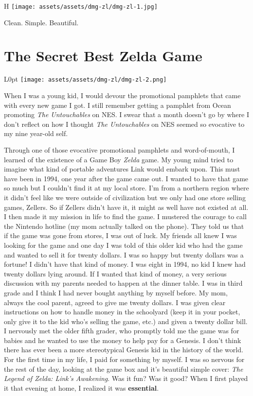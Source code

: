 \documentclass{book}
\begin{document}
\begin{wrapfigure}{H}{\linewidth}
\vskip 4pt
\centering \texttt{[image: assets/assets/dmg-zl/dmg-zl-1.jpg]}\par\pagetwodescription Clean. Simple. Beautiful.\end{wrapfigure}
\clearpage

\FloatBarrier\needspace{5pt}\section*{The Secret Best Zelda Game}\nopagebreak[4]

\begin{wrapfigure}{L}{0pt} \texttt{[image: assets/assets/dmg-zl/dmg-zl-2.png]}\end{wrapfigure}
When I was a young kid, I would devour the promotional pamphlets that came with every new game I got. I still remember getting a pamphlet from Ocean promoting \emph{The Untouchables} on NES. I swear that a month doesn’t go by where I don’t reflect on how I thought \emph{The Untouchables} on NES seemed so evocative to my nine year-old self.

Through one of those evocative promotional pamphlets and word-of-mouth, I learned of the existence of a Game Boy \emph{Zelda} game. My young mind tried to imagine what kind of portable adventures Link would embark upon. This must have been in 1994, one year after the game came out. I wanted to have that game so much but I couldn’t find it at my local store. I’m from a northern region where it didn’t feel like we were outside of civilization but we only had one store selling games, Zellers. So if Zellers didn’t have it, it might as well have not existed at all. I then made it my mission in life to find the game. I mustered the courage to call the Nintendo hotline (my mom actually talked on the phone). They told us that if the game was gone from stores, I was out of luck. My friends all knew I was looking for the game and one day I was told of this older kid who had the game and wanted to sell it for twenty dollars. I was so happy but twenty dollars was a fortune! I didn’t have that kind of money. I was eight in 1994, no kid I knew had twenty dollars lying around. If I wanted that kind of money, a very serious discussion with my parents needed to happen at the dinner table. I was in third grade and I think I had never bought anything by myself before. My mom, always the cool parent, agreed to give me twenty dollars. I was given clear instructions on how to handle money in the schoolyard (keep it in your pocket, only give it to the kid who’s selling the game, etc.) and given a twenty dollar bill. I nervously met the older fifth grader, who promptly told me the game was for babies and he wanted to use the money to help pay for a Genesis. I don’t think there has ever been a more stereotypical Genesis kid in the history of the world. For the first time in my life, I paid for something by myself. I was so nervous for the rest of the day, looking at the game box and it’s beautiful simple cover: \emph{The Legend of Zelda: Link’s Awakening}. Was it fun? Was it good? When I first played it that evening at home, I realized it was \textbf{essential}.
\end{document}
